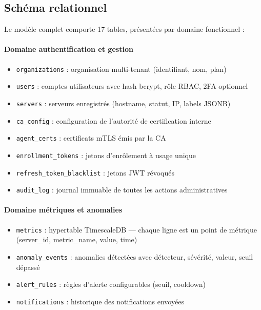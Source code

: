 \subsection{Schéma relationnel}

Le modèle complet comporte 17 tables, présentées par domaine fonctionnel :

\paragraph{Domaine authentification et gestion}
\begin{itemize}
  \item \texttt{organizations} : organisation multi-tenant (identifiant, nom, plan)
  \item \texttt{users} : comptes utilisateurs avec hash bcrypt, rôle RBAC, 2FA optionnel
  \item \texttt{servers} : serveurs enregistrés (hostname, statut, IP, labels JSONB)
  \item \texttt{ca\_config} : configuration de l'autorité de certification interne
  \item \texttt{agent\_certs} : certificats mTLS émis par la CA
  \item \texttt{enrollment\_tokens} : jetons d'enrôlement à usage unique
  \item \texttt{refresh\_token\_blacklist} : jetons JWT révoqués
  \item \texttt{audit\_log} : journal immuable de toutes les actions administratives
\end{itemize}

\paragraph{Domaine métriques et anomalies}
\begin{itemize}
  \item \texttt{metrics} : hypertable TimescaleDB --- chaque ligne est un point
    de métrique (server\_id, metric\_name, value, time)
  \item \texttt{anomaly\_events} : anomalies détectées avec détecteur, sévérité,
    valeur, seuil dépassé
  \item \texttt{alert\_rules} : règles d'alerte configurables (seuil, cooldown)
  \item \texttt{notifications} : historique des notifications envoyées
\end{itemize}


